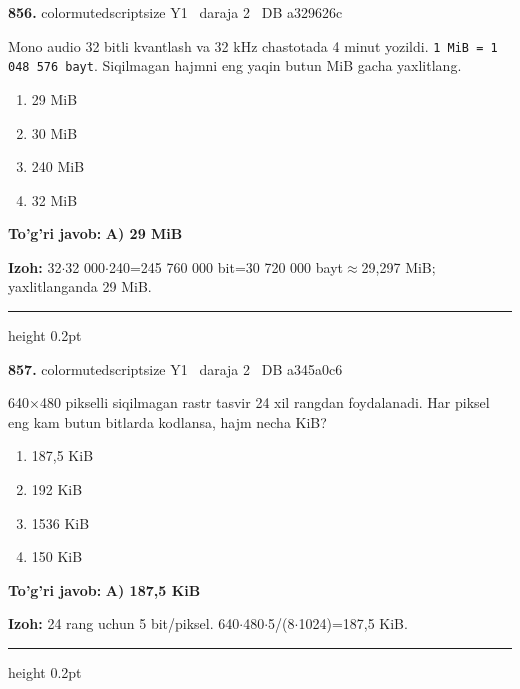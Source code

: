 \documentclass[10pt,a4paper,oneside]{article}
\begin{document}
\noindent\textbf{\color{ink}856.}  {color{muted}scriptsize Y1 \textbullet\ daraja 2 \textbullet\ DB a329626c}
\par
Mono audio 32 bitli kvantlash va 32 kHz chastotada 4 minut yozildi. \texttt{1 MiB = 1 048 576 bayt}. Siqilmagan hajmni eng yaqin butun MiB gacha yaxlitlang.
\begin{enumerate}[label=\Alph*),leftmargin=9mm]
\item 29 MiB
\item 30 MiB
\item 240 MiB
\item 32 MiB
\end{enumerate}
\begin{tcolorbox}[enhanced,breakable,colback=teal!4,colframe=teal!50!black,boxrule=0.5pt,arc=1.1mm,left=3mm,right=3mm,top=1.7mm,bottom=1.7mm,before skip=2mm,after skip=2mm]
\textbf{\color{teal}To'g'ri javob:} \textbf{A) 29 MiB}
\par\smallskip
\textbf{Izoh:} 32\ensuremath{\cdot}32 000\ensuremath{\cdot}240=245 760 000 bit=30 720 000 bayt\ensuremath{\approx}29,297 MiB; yaxlitlanganda 29 MiB.
\end{tcolorbox}
\vspace{2mm}\hrule height 0.2pt \vspace{3mm}

\noindent\textbf{\color{ink}857.}  {color{muted}scriptsize Y1 \textbullet\ daraja 2 \textbullet\ DB a345a0c6}
\par
640\ensuremath{\times}480 pikselli siqilmagan rastr tasvir 24 xil rangdan foydalanadi. Har piksel eng kam butun bitlarda kodlansa, hajm necha KiB?
\begin{enumerate}[label=\Alph*),leftmargin=9mm]
\item 187,5 KiB
\item 192 KiB
\item 1536 KiB
\item 150 KiB
\end{enumerate}
\begin{tcolorbox}[enhanced,breakable,colback=teal!4,colframe=teal!50!black,boxrule=0.5pt,arc=1.1mm,left=3mm,right=3mm,top=1.7mm,bottom=1.7mm,before skip=2mm,after skip=2mm]
\textbf{\color{teal}To'g'ri javob:} \textbf{A) 187,5 KiB}
\par\smallskip
\textbf{Izoh:} 24 rang uchun 5 bit/piksel. 640\ensuremath{\cdot}480\ensuremath{\cdot}5/(8\ensuremath{\cdot}1024)=187,5 KiB.
\end{tcolorbox}
\vspace{2mm}\hrule height 0.2pt \vspace{3mm}
\end{document}
